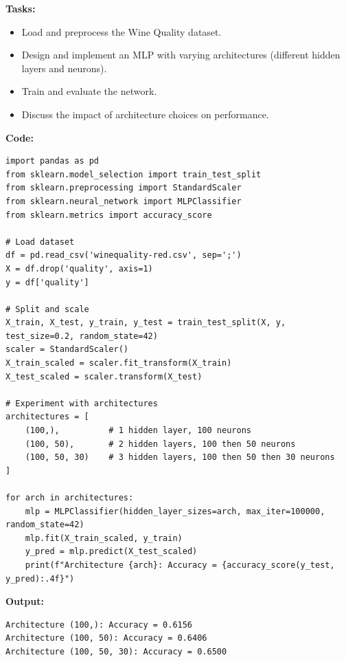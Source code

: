 \documentclass[12pt, a4paper]{article}
\begin{document}
\vspace{\baselineskip}
\noindent \textbf{Tasks:}\\
\vspace{-0.5\baselineskip}
\begin{itemize}[nosep]
    \item Load and preprocess the Wine Quality dataset.
    \item Design and implement an MLP with varying architectures (different hidden layers and neurons).
    \item Train and evaluate the network.
    \item Discuss the impact of architecture choices on performance.
\end{itemize}

\vspace{\baselineskip}
\noindent \textbf{Code:}\\
\begin{lstlisting}
import pandas as pd
from sklearn.model_selection import train_test_split
from sklearn.preprocessing import StandardScaler
from sklearn.neural_network import MLPClassifier
from sklearn.metrics import accuracy_score

# Load dataset
df = pd.read_csv('winequality-red.csv', sep=';')
X = df.drop('quality', axis=1)
y = df['quality']

# Split and scale
X_train, X_test, y_train, y_test = train_test_split(X, y, test_size=0.2, random_state=42)
scaler = StandardScaler()
X_train_scaled = scaler.fit_transform(X_train)
X_test_scaled = scaler.transform(X_test)

# Experiment with architectures
architectures = [
    (100,),          # 1 hidden layer, 100 neurons
    (100, 50),       # 2 hidden layers, 100 then 50 neurons
    (100, 50, 30)    # 3 hidden layers, 100 then 50 then 30 neurons
]

for arch in architectures:
    mlp = MLPClassifier(hidden_layer_sizes=arch, max_iter=100000, random_state=42)
    mlp.fit(X_train_scaled, y_train)
    y_pred = mlp.predict(X_test_scaled)
    print(f"Architecture {arch}: Accuracy = {accuracy_score(y_test, y_pred):.4f}")
\end{lstlisting}

\vspace{\baselineskip}

\noindent \textbf{Output:}\\
\begin{lstlisting}[style=terminal]
Architecture (100,): Accuracy = 0.6156
Architecture (100, 50): Accuracy = 0.6406
Architecture (100, 50, 30): Accuracy = 0.6500
\end{lstlisting}
\end{document}
